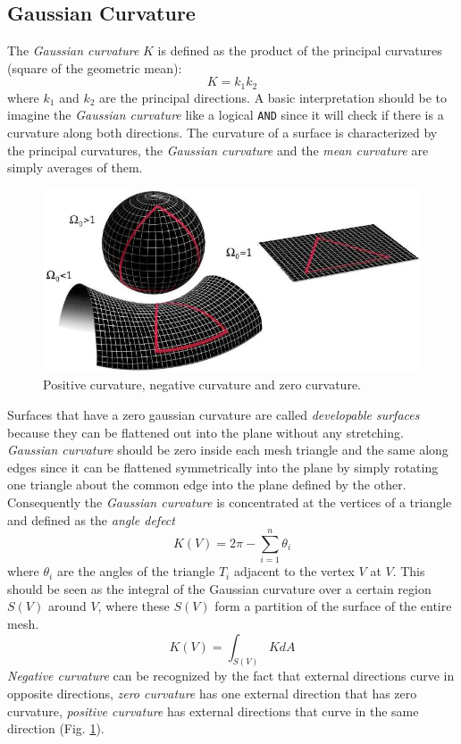 \subsection{Gaussian Curvature}
The \textit{Gaussian curvature} $K$ is defined as the product of the principal curvatures (square of the geometric mean):
$$K=k_1k_2$$
where $k_1$ and $k_2$ are the principal directions. A basic interpretation should be to imagine the \textit{Gaussian curvature} like a logical \texttt{AND} since it will check if there is a curvature along both directions.
The curvature of a surface is characterized by the principal curvatures, the \textit{Gaussian curvature} and the \textit{mean curvature} are simply averages of them.
\cite{WEBSITE:gaussiancurvaturedirty}
\begin{figure}[h]
  \centering
\includegraphics[scale=0.5]{images/gaussian_curvature_examples.png}
\caption{Positive curvature, negative curvature and zero curvature.}\label{fig:curvature-gaussian}
\end{figure}
Surfaces that have a zero gaussian curvature are called \textit{developable surfaces} because they can be flattened out into the plane without any stretching. \textit{Gaussian curvature} should be zero inside each mesh triangle and the same along edges since it can be flattened symmetrically into the plane by simply rotating one triangle about the common edge into the plane defined by the other. Consequently the \textit{Gaussian curvature} is concentrated at the vertices of a triangle and defined as the \textit{angle defect}
$$K(V) = 2 \pi - \sum_{i=1}^n \theta_i$$
where $\theta_i$ are the angles of the triangle $T_i$ adjacent to the vertex $V$ at $V$. This should be seen as the integral of the Gaussian curvature over a certain region $S(V)$ around $V$, where these $S(V)$ form a partition of the surface of the entire mesh.
$$ K(V) = \int_{S(V)} KdA  $$
\textit{Negative curvature} can be recognized by the fact that external directions curve in opposite directions, \textit{zero curvature} has one external direction that has zero curvature, \textit{positive curvature} has external directions that curve in the same direction (Fig. \ref{fig:curvature-gaussian}).
